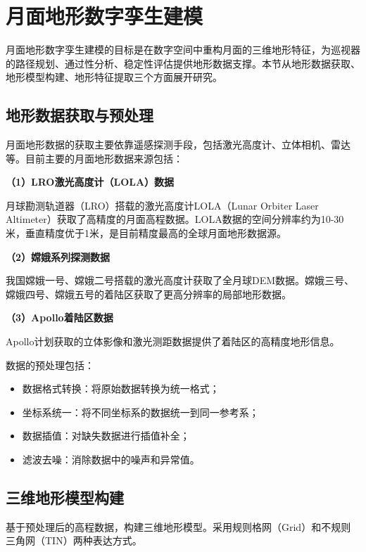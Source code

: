 \section{月面地形数字孪生建模}
\label{sec:terrain_modeling}

月面地形数字孪生建模的目标是在数字空间中重构月面的三维地形特征，为巡视器的路径规划、通过性分析、稳定性评估提供地形数据支撑。本节从地形数据获取、地形模型构建、地形特征提取三个方面展开研究。

\subsection{地形数据获取与预处理}
\label{subsec:terrain_data}

月面地形数据的获取主要依靠遥感探测手段，包括激光高度计、立体相机、雷达等。目前主要的月面地形数据来源包括：

\textbf{（1）LRO激光高度计（LOLA）数据}

月球勘测轨道器（LRO）搭载的激光高度计LOLA（Lunar Orbiter Laser Altimeter）获取了高精度的月面高程数据。LOLA数据的空间分辨率约为10-30米，垂直精度优于1米，是目前精度最高的全球月面地形数据源\cite{ref46}。

\textbf{（2）嫦娥系列探测数据}

我国嫦娥一号、嫦娥二号搭载的激光高度计获取了全月球DEM数据。嫦娥三号、嫦娥四号、嫦娥五号的着陆区获取了更高分辨率的局部地形数据\cite{ref47}。

\textbf{（3）Apollo着陆区数据}

Apollo计划获取的立体影像和激光测距数据提供了着陆区的高精度地形信息\cite{ref48}。

数据的预处理包括：
\begin{itemize}
    \item 数据格式转换：将原始数据转换为统一格式；
    \item 坐标系统一：将不同坐标系的数据统一到同一参考系；
    \item 数据插值：对缺失数据进行插值补全；
    \item 滤波去噪：消除数据中的噪声和异常值。
\end{itemize}

\subsection{三维地形模型构建}
\label{subsec:terrain_3d}

基于预处理后的高程数据，构建三维地形模型。采用规则格网（Grid）和不规则三角网（TIN）两种表达方式。

